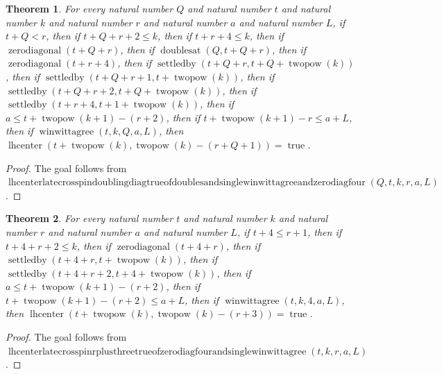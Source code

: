 \documentclass[11pt]{article}
\newtheorem{theorem}{Theorem}[section]
\theoremstyle{definition}
\begin{document}
\begin{theorem}
\label{ll:paper:lhcenter-late-cross-pin-doubling-diag-true-of-doubles-and-single-winwittagree-and-zero-diag-four}
For every natural number \(Q\) and natural number \(t\) and natural number \(k\) and natural number \(r\) and natural number \(a\) and natural number \(L\), if \(t + Q < r\), then if \(t + Q + r + 2 \le k\), then if \(t + r + 4 \le k\), then if \(\operatorname{zerodiagonal}(t + Q + r)\), then if \(\operatorname{doublesat}(Q, t + Q + r)\), then if \(\operatorname{zerodiagonal}(t + r + 4)\), then if \(\operatorname{settledby}(t + Q + r, t + Q + \operatorname{twopow}(k))\), then if \(\operatorname{settledby}(t + Q + r + 1, t + \operatorname{twopow}(k))\), then if \(\operatorname{settledby}(t + Q + r + 2, t + Q + \operatorname{twopow}(k))\), then if \(\operatorname{settledby}(t + r + 4, t + 1 + \operatorname{twopow}(k))\), then if \(a \le t + \operatorname{twopow}(k + 1) - (r + 2)\), then if \(t + \operatorname{twopow}(k + 1) - r \le a + L\), then if \(\operatorname{winwittagree}(t, k, Q, a, L)\), then \(\operatorname{lhcenter}(t + \operatorname{twopow}(k), \operatorname{twopow}(k) - (r + Q + 1)) = \operatorname{true}\).
\end{theorem}
\begin{proof}
The goal follows from \(\operatorname{lhcenterlatecrosspindoublingdiagtrueofdoublesandsinglewinwittagreeandzerodiagfour}(Q, t, k, r, a, L)\).
\end{proof}
\begin{theorem}
\label{ll:paper:lhcenter-late-cross-pin-r-plus-three-true-of-zero-diag-four-and-single-winwittagree}
For every natural number \(t\) and natural number \(k\) and natural number \(r\) and natural number \(a\) and natural number \(L\), if \(t + 4 \le r + 1\), then if \(t + 4 + r + 2 \le k\), then if \(\operatorname{zerodiagonal}(t + 4 + r)\), then if \(\operatorname{settledby}(t + 4 + r, t + \operatorname{twopow}(k))\), then if \(\operatorname{settledby}(t + 4 + r + 2, t + 4 + \operatorname{twopow}(k))\), then if \(a \le t + \operatorname{twopow}(k + 1) - (r + 2)\), then if \(t + \operatorname{twopow}(k + 1) - (r + 2) \le a + L\), then if \(\operatorname{winwittagree}(t, k, 4, a, L)\), then \(\operatorname{lhcenter}(t + \operatorname{twopow}(k), \operatorname{twopow}(k) - (r + 3)) = \operatorname{true}\).
\end{theorem}
\begin{proof}
The goal follows from \(\operatorname{lhcenterlatecrosspinrplusthreetrueofzerodiagfourandsinglewinwittagree}(t, k, r, a, L)\).
\end{proof}
\end{document}
